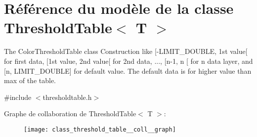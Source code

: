 \hypertarget{class_threshold_table}{}\section{Référence du modèle de la classe Threshold\+Table$<$ T $>$}
\label{class_threshold_table}


The Color\+Threshold\+Table class Construction like \mbox{[}-\/\+L\+I\+M\+I\+T\+\_\+\+D\+O\+U\+B\+LE, 1st value\mbox{[} for first data, \mbox{[}1st value, 2nd value\mbox{[} for 2nd data, ..., \mbox{[}n-\/1, n \mbox{[} for n data layer, and \mbox{[}n, L\+I\+M\+I\+T\+\_\+\+D\+O\+U\+B\+LE\mbox{]} for default value. The default data is for higher value than max of the table.  




{\ttfamily \#include $<$thresholdtable.\+h$>$}



Graphe de collaboration de Threshold\+Table$<$ T $>$\+:
\nopagebreak
\begin{figure}[H]
\begin{center}
\leavevmode
\texttt{[image: class\_threshold\_table\_\_coll\_\_graph]}
\end{center}
\end{figure}
